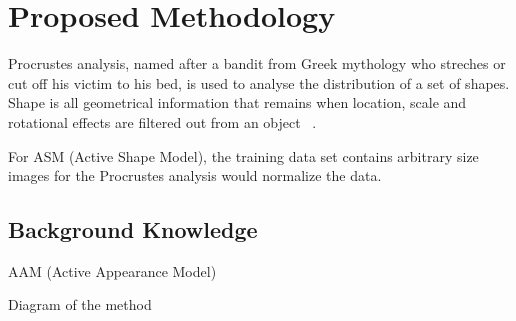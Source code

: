 \chapter{Proposed Methodology}

Procrustes analysis, named after a bandit from Greek mythology who streches or cut off his victim to his bed, is used to analyse the distribution of a set of shapes. Shape is all geometrical information that remains when location, scale and rotational effects are filtered out from an object ~\cite{IMM2002-0403}. 

For ASM (Active Shape Model), the training data set contains arbitrary size images for the Procrustes analysis would normalize the data.

\section{Background Knowledge}
AAM (Active Appearance Model)

Diagram of the method